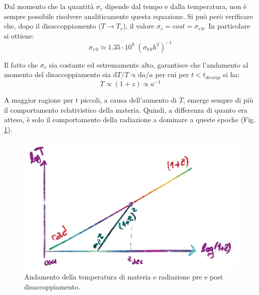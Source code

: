 Dal momento che la quantità $\sigma_{r}$ dipende dal tempo e dalla temperatura, non è sempre possibile risolvere analiticamente questa equazione. Si può però verificare che, dopo il disaccoppiamento ($T\to T_{r}$), il valore $\sigma_{r}=cost=\sigma_{r \, 0}$. In particolare si ottiene:
\begin{equation*}
    \sigma_{r \, 0} \simeq 1.35 \cdot 10^8 \; (\sigma_{b\, 0}h^2)^{-1}
\end{equation*}

Il fatto che $\sigma_{r}$ sia costante ed estremamente alto, garantisce che l'andamento al momento del disaccoppiamento sia $\mathrm{d}T / T \propto \mathrm{d}a / a$ per cui per $t<t_{decoup}$ si ha: 
\begin{equation}
T \propto (1+z) \propto a^{-1} 
\end{equation}

A maggior ragione per $t$ piccoli, a causa dell'aumento di $T$, emerge sempre di più il comportamento relativistico della materia. Quindi, a differenza di quanto era atteso, è solo il comportamento della radiazione a dominare a queste epoche (Fig. \ref{fig:3logzt}).
\begin{figure}[ht]
    \centering
    \includegraphics[width=.85\textwidth]{Pictures/3/logT-z.jpg}
    \caption{Andamento della temperatura di materia e radiazione pre e post disaccoppiamento.}
    \label{fig:3logzt}
\end{figure}

